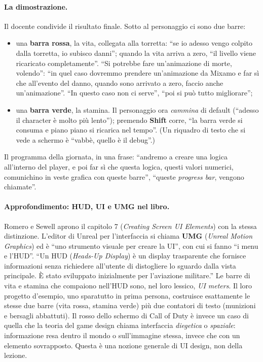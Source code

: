 \paragraph{La dimostrazione.} Il docente condivide il risultato finale. Sotto al
personaggio ci sono due barre:
\begin{itemize}
  \item una \textbf{barra rossa}, la vita, collegata alla torretta: ``se io adesso vengo
        colpito dalla torretta, io subisco danni''; quando la vita arriva a zero, ``il
        livello viene ricaricato completamente''. ``Si potrebbe fare un'animazione di
        morte, volendo'': ``in quel caso dovremmo prendere un'animazione da Mixamo e far
        sì che all'evento del danno, quando sono arrivato a zero, faccio anche
        un'animazione''. ``In questo caso non ci serve'', ``poi si può tutto migliorare'';
  \item una \textbf{barra verde}, la stamina. Il personaggio ora \emph{cammina} di default
        (``adesso il character è molto più lento''); premendo \textbf{Shift} corre, ``la
        barra verde si consuma e piano piano si ricarica nel tempo''. (Un riquadro di testo
        che si vede a schermo è ``vabbè, quello è il debug''.)
\end{itemize}
Il programma della giornata, in una frase: ``andremo a creare una logica all'interno del
player, e poi far sì che questa logica, questi valori numerici, comunichino in veste
grafica con queste barre'', ``queste \emph{progress bar}, vengono chiamate''.

\paragraph{Approfondimento: HUD, UI e UMG nel libro.} Romero e Sewell aprono il capitolo 7
(\emph{Creating Screen UI Elements}) con la stessa distinzione. L'editor di Unreal per
l'interfaccia si chiama \textbf{UMG} (\emph{Unreal Motion Graphics}) ed è ``uno strumento
visuale per creare la UI'', con cui si fanno ``i menu e l'HUD''. ``Un HUD
(\emph{Heads-Up Display}) è un display trasparente che fornisce informazioni senza
richiedere all'utente di distogliere lo sguardo dalla vista principale. È stato sviluppato
inizialmente per l'aviazione militare.'' Le barre di vita e stamina che compaiono
nell'HUD sono, nel loro lessico, \emph{UI meters}. Il loro progetto d'esempio, uno
sparatutto in prima persona, costruisce esattamente le stesse due barre (vita rossa,
stamina verde) più due contatori di testo (munizioni e bersagli abbattuti). Il rosso dello
schermo di Call of Duty è invece un caso di quella che la teoria del game design chiama
interfaccia \emph{diegetica} o \emph{spaziale}: informazione resa dentro il mondo o
sull'immagine stessa, invece che con un elemento sovrapposto. Questa è una nozione
generale di UI design, non della lezione.

